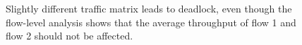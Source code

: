 %
%

\begin{figure}[t]
\centering

\vspace{-0.15in}
\caption{Slightly different traffic matrix leads to deadlock, even though
the flow-level analysis shows that the average throughput of flow 1 and flow 2 should not be affected.
}
\vspace{-0.2in}
\label{fig:case2}
\end{figure}


